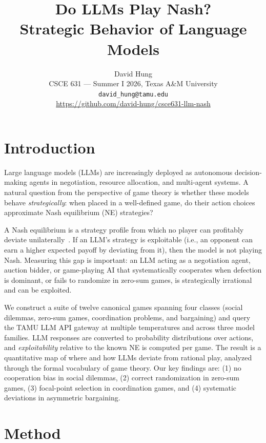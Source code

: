 \documentclass[10pt,twocolumn]{article}
\title{\textbf{Do LLMs Play Nash?}\\
       \large Strategic Behavior of Language Models}
\author{David Hung\\
        \small CSCE 631 --- Summer I 2026, Texas A\&M University\\
        \small \texttt{david\_hung@tamu.edu}\\
        \small \url{https://github.com/david-hung/csce631-llm-nash}}
\date{}
\begin{document}
\maketitle

\section{Introduction}

Large language models (LLMs) are increasingly deployed as autonomous decision-making
agents in negotiation, resource allocation, and multi-agent systems.
A natural question from the perspective of game theory is whether these models behave
\emph{strategically}: when placed in a well-defined game, do their action choices
approximate Nash equilibrium (NE) strategies?

A Nash equilibrium is a strategy profile from which no player can profitably deviate
unilaterally~\cite{nash1950equilibrium}.
If an LLM's strategy is exploitable (i.e., an opponent can earn a higher expected
payoff by deviating from it), then the model is not playing Nash.
Measuring this gap is important: an LLM acting as a negotiation agent, auction
bidder, or game-playing AI that systematically cooperates when defection is dominant,
or fails to randomize in zero-sum games, is strategically irrational and can be
exploited.

We construct a suite of twelve canonical games spanning four classes (social
dilemmas, zero-sum games, coordination problems, and bargaining) and query the TAMU
LLM API gateway at multiple temperatures and across three model families.
LLM responses are converted to probability distributions over actions, and
\emph{exploitability} relative to the known NE is computed per game.
The result is a quantitative map of where and how LLMs deviate from rational play,
analyzed through the formal vocabulary of game theory.
Our key findings are: (1) no cooperation bias in social dilemmas, (2) correct
randomization in zero-sum games, (3) focal-point selection in coordination games,
and (4) systematic deviations in asymmetric bargaining.

\section{Method}
\end{document}
